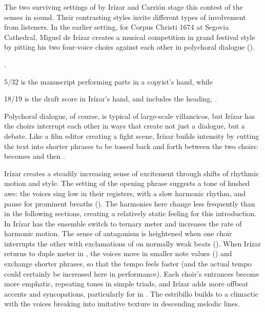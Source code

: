 
The two surviving settings of  by Irízar and Carrión stage this contest of the senses in sound.
Their contrasting styles invite different types of involvement from listeners.
In the earlier setting, for Corpus Christi 1674 at Segovia Cathedral, Miguel de Irízar creates a musical competition in grand festival style by pitting his two four-voice choirs against each other in polychoral dialogue ().%
\begin{Footnote}
    \Autocite{Cashner:SingingAboutSingingI}.
    \signature{E-SE}{5/32} is the manuscript performing parts in a copyist's hand, while \signature{E-SE}{18/19} is the draft score in Irízar's hand, and includes the heading, .
\end{Footnote}
Polychoral dialogue, of course, is typical of large-scale villancicos, but Irízar has the choirs interrupt each other in ways that create not just a dialogue, but a debate.
Like a film editor creating a fight scene, Irízar builds intensity by cutting the text into shorter phrases to be tossed back and forth between the two choirs:  becomes  and then .


Irízar creates a steadily increasing sense of excitement through shifts of rhythmic motion and style.
The setting of the opening phrase suggests a tone of hushed awe: the voices sing low in their registers, with a slow harmonic rhythm, and pause for prominent breaths ().
The harmonies here change less frequently than in the following sections, creating a relatively static feeling for this introduction.
In  Irízar has the ensemble switch to ternary meter and increases the rate of harmonic motion.
The sense of antagonism is heightened when one choir interrupts the other with exclamations of  on normally weak beats ().
When Irízar returns to duple meter in , the voices move in smaller note values () and exchange shorter phrases, so that the tempo feels faster (and the actual tempo could certainly be increased here in performance).
Each choir's entrances become more emphatic, repeating tones in simple triads, and Irízar adds more offbeat accents and syncopations, particularly for  in .
The estribillo builds to a climactic  with the voices breaking into imitative texture in descending melodic lines.

